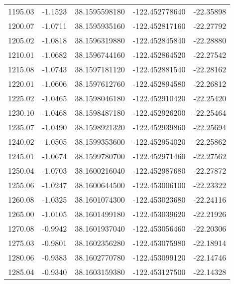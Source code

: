 \begin{scriptsize}
\begin{longtable}{p{2.5cm}p{2.5cm}p{3cm}p{3cm}p{2.5cm}}
          1195.03  & 	-1.1523 &               38.1595598180  &   -122.452778640   &	-22.35898 \\
          1200.07  & 	-1.0711 &               38.1595935160  &   -122.452817160   &	-22.27792 \\
          1205.02  & 	-1.0818 &               38.1596319880  &   -122.452845840   &	-22.28880 \\
          1210.01  & 	-1.0682 &               38.1596744160  &   -122.452864520   &	-22.27542 \\
          1215.08  & 	-1.0743 &               38.1597181120  &   -122.452881540   &	-22.28162 \\
          1220.01  & 	-1.0606 &               38.1597612760  &   -122.452894580   &	-22.26812 \\
          1225.02  & 	-1.0465 &               38.1598046180  &   -122.452910420   &	-22.25420 \\
          1230.10  & 	-1.0468 &               38.1598487180  &   -122.452926200   &	-22.25464 \\
          1235.07  & 	-1.0490 &               38.1598921320  &   -122.452939860   &	-22.25694 \\
          1240.02  & 	-1.0505 &               38.1599353600  &   -122.452954020   &	-22.25862 \\
          1245.01  & 	-1.0674 &               38.1599780700  &   -122.452971460   &	-22.27562 \\
          1250.04  & 	-1.0703 &               38.1600216040  &   -122.452987680   &	-22.27872 \\
          1255.06  & 	-1.0247 &               38.1600644500  &   -122.453006100   &	-22.23322 \\
          1260.08  & 	-1.0325 &               38.1601074300  &   -122.453023680   &	-22.24116 \\
          1265.00  & 	-1.0105 &               38.1601499180  &   -122.453039620   &	-22.21926 \\
          1270.08  & 	-0.9942 &               38.1601937040  &   -122.453056460   &	-22.20306 \\
          1275.03  & 	-0.9801 &               38.1602356280  &   -122.453075980   &	-22.18914 \\
          1280.06  & 	-0.9383 &               38.1602770780  &   -122.453099120   &	-22.14746 \\
          1285.04  & 	-0.9340 &               38.1603159380  &   -122.453127500   &	-22.14328 \\

\end{longtable}
\end{scriptsize}
